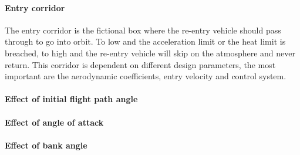 \paragraph{Entry corridor}
The entry corridor is the fictional box where the re-entry vehicle should pass through to go into orbit. To low and the acceleration limit or the heat limit is breached, to high and the re-entry vehicle will skip on the atmosphere and never return. This corridor is dependent on different design parameters, the most important are the aerodynamic coefficients, entry velocity and control system.


\paragraph{Effect of initial flight path angle}

\paragraph{Effect of angle of attack}

\paragraph{Effect of bank angle}



